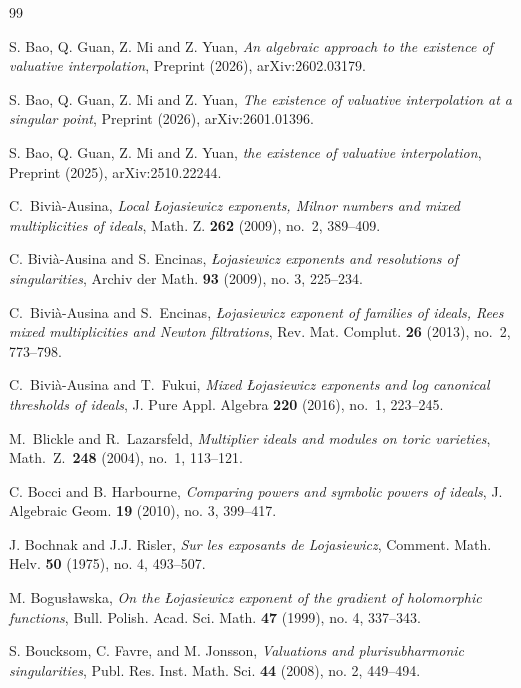 \documentclass[12pt]{amsart}
\theoremstyle{plain}
\theoremstyle{definition}
\numberwithin{equation}{section}
\begin{document}
\begin{thebibliography}{99}

    S. Bao, Q. Guan, Z. Mi and Z. Yuan,
    \emph{An algebraic approach to the existence of valuative interpolation},
    Preprint (2026), arXiv:2602.03179.
    
    S. Bao, Q. Guan, Z. Mi and Z. Yuan,
    \emph{The existence of valuative interpolation at a singular point},
    Preprint (2026), arXiv:2601.01396.
    
    S. Bao, Q. Guan, Z. Mi and Z. Yuan,
    \emph{the existence of valuative interpolation},
    Preprint (2025), arXiv:2510.22244.
    
	C.~Bivi\`a-Ausina,
	\emph{Local \L ojasiewicz exponents, Milnor numbers and mixed multiplicities of ideals},
	Math. Z. \textbf{262} (2009), no.~2, 389--409.

	
	C. Bivi\`a-Ausina and S. Encinas,
	\emph{\L{}ojasiewicz exponents and resolutions of singularities},
	Archiv der Math. \textbf{93} (2009), no. 3, 225--234.
	
	C.~Bivi\`a-Ausina and S.~Encinas,
	\emph{\L ojasiewicz exponent of families of ideals, Rees mixed multiplicities and Newton filtrations},
	Rev. Mat. Complut. \textbf{26} (2013), no.~2, 773--798.
	
	C.~Bivi\`a-Ausina and T.~Fukui,
	\emph{Mixed \L ojasiewicz exponents and log canonical thresholds of ideals},
	J. Pure Appl. Algebra \textbf{220} (2016), no.~1, 223--245.
	
	M.~Blickle and R.~Lazarsfeld,
	\emph{Multiplier ideals and modules on toric varieties},
	Math.\ Z.\ \textbf{248} (2004), no.~1, 113--121.
	
	
	C. Bocci and B. Harbourne,
	\emph{Comparing powers and symbolic powers of ideals}, 
	J. Algebraic Geom. \textbf{19} (2010), no. 3, 399--417.
	
	J. Bochnak and J.J. Risler,
	\emph{Sur les exposants de Lojasiewicz},
	Comment. Math. Helv. \textbf{50} (1975), no. 4, 493--507.
	
	M. Bogus\l{}awska,
	\emph{On the \L{}ojasiewicz exponent of the gradient of holomorphic functions},
	Bull. Polish. Acad. Sci. Math. \textbf{47} (1999), no. 4, 337--343.
	
    S. Boucksom, C. Favre, and M. Jonsson,
    \emph{Valuations and plurisubharmonic singularities},
    Publ. Res. Inst. Math. Sci. \textbf{44} (2008), no. 2, 449--494.
	

\end{thebibliography}
\end{document}
